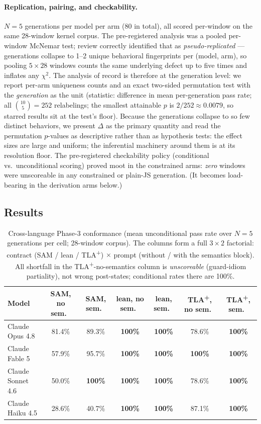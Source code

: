 \documentclass[11pt]{article}
\newcommand{\tlaplus}{TLA\texorpdfstring{\textsuperscript{+}}{+}}
\begin{document}
\paragraph{Replication, pairing, and checkability.}
$N{=}5$ generations per model per arm (80 in total), all scored per-window on
the same 28-window kernel corpus. The pre-registered analysis was a pooled
per-window McNemar test; review correctly identified that as
\emph{pseudo-replicated} --- generations collapse to 1--2 unique behavioral
fingerprints per (model, arm), so pooling $5\times28$ windows counts the same
underlying defect up to five times and inflates any $\chi^2$. The analysis of
record is therefore at the generation level: we report per-arm uniqueness
counts and an exact two-sided permutation test with the \emph{generation} as
the unit (statistic: difference in mean per-generation pass rate; all
$\binom{10}{5}=252$ relabelings; the smallest attainable $p$ is
$2/252\approx0.0079$, so starred results sit at the test's floor). Because
the generations collapse to so few distinct behaviors, we present $\Delta$
as the primary quantity and read the permutation $p$-values as descriptive
rather than as hypothesis tests: the effect sizes are large and uniform;
the inferential machinery around them is at its resolution floor. The
pre-registered checkability policy (conditional vs.\ unconditional scoring)
proved moot in the constrained arms: \emph{zero} windows were unscoreable
in any constrained or plain-JS generation. (It becomes load-bearing in the
derivation arms below.)

\subsection{Results}

\begin{table}[ht]
\centering
\caption{Cross-language Phase-3 conformance (mean unconditional pass rate
over $N{=}5$ generations per cell; 28-window corpus). The columns form a
full $3{\times}2$ factorial: contract (SAM / lean / \tlaplus{}) $\times$
prompt (without / with the semantics block). All shortfall in the
\tlaplus{}-no-semantics column is \emph{unscoreable} (guard-idiom
partiality), not wrong post-states; conditional rates there are 100\%.}
\label{tab:crosslang}
\small
\begin{tabular}{lcccccc}
\toprule
Model & SAM, no sem.\ & SAM, sem.\ & lean, no sem.\ & lean, sem.\ & \tlaplus{}, no sem.\ & \tlaplus{}, sem.\ \\
\midrule
Claude Opus 4.8   & 81.4\% & 89.3\%          & \textbf{100\%} & \textbf{100\%} & 78.6\% & \textbf{100\%} \\
Claude Fable 5    & 57.9\% & 95.7\%          & \textbf{100\%} & \textbf{100\%} & \textbf{100\%} & \textbf{100\%} \\
Claude Sonnet 4.6 & 50.0\% & \textbf{100\%}  & \textbf{100\%} & \textbf{100\%} & 78.6\% & \textbf{100\%} \\
Claude Haiku 4.5  & 28.6\% & 40.7\%          & \textbf{100\%} & \textbf{100\%} & 87.1\% & \textbf{100\%} \\
\bottomrule
\end{tabular}
\end{table}
\end{document}
